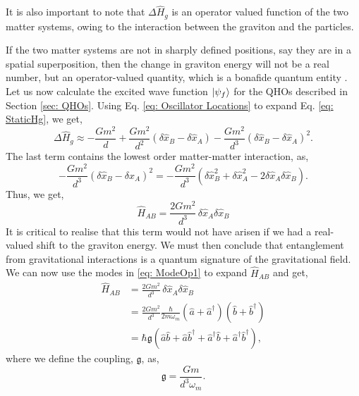 \documentclass[12pt,a4paper]{report}
\theoremstyle{plain}
\theoremstyle{definition}
\theoremstyle{remark}
\renewcommand{\dag}{\dagger}
\newcommand{\Hab}{\hat{H}_{AB}}
\newcommand{\ahat}{\hat{a}}
\newcommand{\bhat}{\hat{b}}
\DeclarePairedDelimiter\ket{\lvert}{\rangle}
\begin{document}
It is also important to note that $\Delta\hat{H}_g$ is an operator valued function of the two matter systems, owing to the interaction between the graviton and the particles.

If the two matter systems are not in sharply defined positions, say they are in a spatial superposition, then the change in graviton energy will not be a real number, but an operator-valued quantity, which is a bonafide quantum entity \cite{Bose_2022}. Let us now calculate the excited wave function $\ket{\psi_f}$ for the QHOs described in Section \ref{sec: QHOs}. Using Eq. \ref{eq: Oscillator Locations} to expand Eq. \ref{eq: StaticHg}, we get,
\begin{equation}
    \Delta\hat{H}_{g}\approx-\frac{Gm^{2}}{d}+\frac{Gm^{2}}{d^{2}}(\delta\hat{x}_{B}-\delta\hat{x}_{A})-\frac{Gm^{2}}{d^{3}}(\delta\hat{x}_{B}-\delta\hat{x}_{A})^{2}.
\end{equation}
The last term contains the lowest order matter-matter interaction, as,
\begin{equation}
    -\frac{Gm^{2}}{d^{3}}(\delta\hat{x}_{B}-\delta\hat{x}_{A})^{2} = -\frac{Gm^{2}}{d^{3}}(\delta\hat{x}_{B}^2+\delta\hat{x}_{A}^2 - 2\delta\hat{x}_{A}\delta\hat{x}_{B}).
\end{equation}
Thus, we get,
\begin{equation}
    \Hab = \frac{2Gm^{2}}{d^{3}}\,\delta\hat{x}_{A}\delta\hat{x}_{B}
\end{equation}
It is critical to realise that this term would not have arisen if we had a real-valued shift to the graviton energy. We must then conclude that entanglement from gravitational interactions is a quantum signature of the gravitational field.
We can now use the modes in \ref{eq: ModeOp1} to expand $\Hab$ and get,
\begin{equation}
    \begin{aligned}
        \Hab &= \frac{2Gm^{2}}{d^{3}}\,\delta\hat{x}_{A}\delta\hat{x}_{B} \\
        &= \frac{2Gm^{2}}{d^{3}} \frac{\hbar}{2m\omega_m} (\ahat + \ahat^{\dag})(\bhat + \bhat^{\dag}) \\
        &= \hbar \mathfrak{g} (\ahat\bhat+\ahat\bhat^{\dag}+\ahat^{\dag}\bhat+\ahat^{\dag}\bhat^{\dag}),
    \end{aligned}
\end{equation}
where we define the coupling, $\mathfrak{g}$, as,
\begin{equation} \label{eq: CouplingStat}
    \mathfrak{g} = \frac{Gm}{d^3\omega_m}.
\end{equation}
\end{document}
